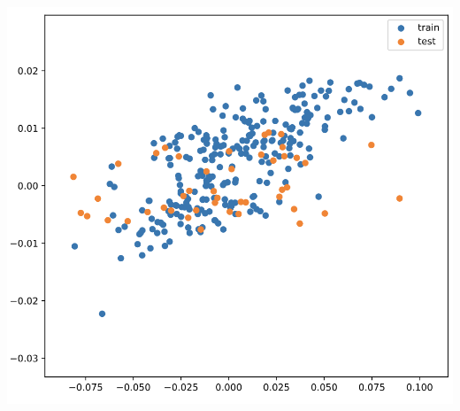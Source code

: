 \documentclass[11pt]{article}
\begin{document}
\begin{center}
\includegraphics[width=.9\linewidth]{rf.png}
\end{center}
\end{document}
